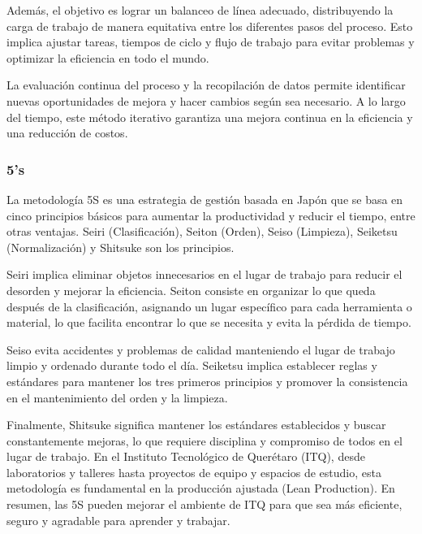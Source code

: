     Además, el objetivo es lograr un balanceo de línea adecuado, distribuyendo la carga de trabajo de manera equitativa entre los diferentes pasos del proceso. Esto implica ajustar tareas, tiempos de ciclo y flujo de trabajo para evitar problemas y optimizar la eficiencia en todo el mundo.
    
    La evaluación continua del proceso y la recopilación de datos permite identificar nuevas oportunidades de mejora y hacer cambios según sea necesario. A lo largo del tiempo, este método iterativo garantiza una mejora continua en la eficiencia y una reducción de costos.
    \subsubsection{5's}
    
    La metodología 5S es una estrategia de gestión basada en Japón que se basa en cinco principios básicos para aumentar la productividad y reducir el tiempo, entre otras ventajas. Seiri (Clasificación), Seiton (Orden), Seiso (Limpieza), Seiketsu (Normalización) y Shitsuke son los principios.
    
    Seiri implica eliminar objetos innecesarios en el lugar de trabajo para reducir el desorden y mejorar la eficiencia. Seiton consiste en organizar lo que queda después de la clasificación, asignando un lugar específico para cada herramienta o material, lo que facilita encontrar lo que se necesita y evita la pérdida de tiempo.
    
    Seiso evita accidentes y problemas de calidad manteniendo el lugar de trabajo limpio y ordenado durante todo el día. Seiketsu implica establecer reglas y estándares para mantener los tres primeros principios y promover la consistencia en el mantenimiento del orden y la limpieza.
    
    Finalmente, Shitsuke significa mantener los estándares establecidos y buscar constantemente mejoras, lo que requiere disciplina y compromiso de todos en el lugar de trabajo. En el Instituto Tecnológico de Querétaro (ITQ), desde laboratorios y talleres hasta proyectos de equipo y espacios de estudio, esta metodología es fundamental en la producción ajustada (Lean Production). En resumen, las 5S pueden mejorar el ambiente de ITQ para que sea más eficiente, seguro y agradable para aprender y trabajar.
